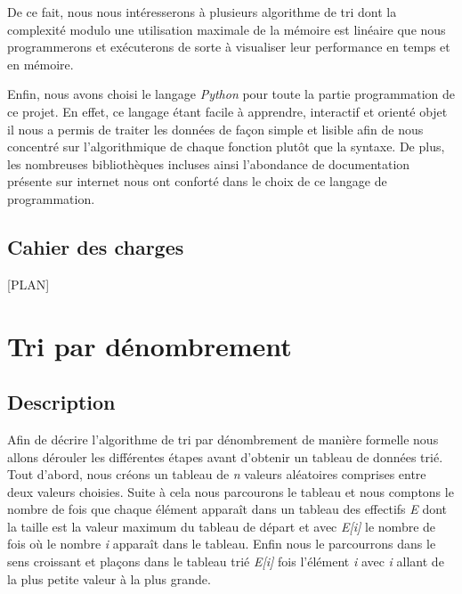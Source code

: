 \documentclass[12pt]{article}
\begin{document}
\hspace{1.0 cm}De ce fait, nous nous intéresserons à plusieurs algorithme de tri dont la complexité modulo une utilisation maximale de la mémoire est linéaire que nous programmerons et exécuterons de sorte à visualiser leur performance en temps et
en mémoire.

\hspace{1.0 cm} Enfin, nous avons choisi le langage\textit{ Python} pour toute la partie programmation de ce projet. En effet, ce langage étant facile à apprendre, interactif et orienté objet il nous a permis de traiter les données de façon simple et lisible afin de nous concentré sur l'algorithmique de chaque fonction plutôt que la syntaxe. 
De plus, les nombreuses bibliothèques incluses ainsi l'abondance de documentation présente sur internet nous ont conforté dans le choix de ce langage de programmation.

\newpage

\subsection*{Cahier des charges}



[PLAN]
\newpage

\tableofcontents

\newpage





\section{Tri par dénombrement}

\subsection{Description}



\hspace{1.0 cm} Afin de décrire l'algorithme de tri par dénombrement de manière formelle nous allons dérouler les différentes étapes avant d'obtenir un tableau de données trié. Tout d'abord, nous créons un tableau de \textit{n} valeurs aléatoires comprises entre deux valeurs choisies. Suite à cela nous parcourons le tableau et nous comptons le nombre de fois que chaque élément apparaît dans un tableau des effectifs \textit{E} dont la taille est la valeur maximum du tableau de départ et avec \textit{E[i] }le nombre de fois où le nombre \textit{i} apparaît dans le tableau.
Enfin nous le parcourrons dans le sens croissant et plaçons dans le tableau trié \textit{E[i]} fois l’élément \textit{i} avec \textit{i} allant de la plus petite valeur à la plus grande.
\end{document}
